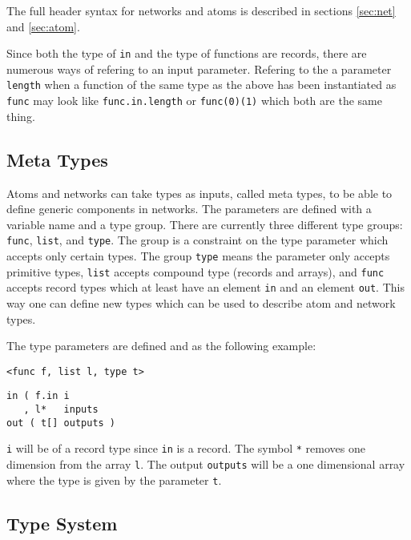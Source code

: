 The full header syntax for networks and atoms is described in sections
\autoref{sec:net} and \autoref{sec:atom}.

Since both the type of \verb#in# and the type of functions are
records, there are numerous ways of refering to an input
parameter. Refering to the a parameter \verb#length# when a function
of the same type as the above has been instantiated as \verb#func# may
look like \verb#func.in.length# or \verb#func(0)(1)# which both are
the same thing.

\subsection{Meta Types}\label{sec:meta}
Atoms and networks can take types as inputs, called meta types, to be
able to define generic components in networks. The parameters are
defined with a variable name and a type group. There are currently
three different type groups: \verb#func#, \verb#list#, and
\verb#type#. The group is a constraint on the type parameter which
accepts only certain types. The group \verb#type# means the parameter
only accepts primitive types, \verb#list# accepts compound type
(records and arrays), and \verb#func# accepts record types which at
least have an element \verb#in# and an element \verb#out#. This way
one can define new types which can be used to describe atom and
network types.

The type parameters are defined and as the following example:

\begin{verbatim}
<func f, list l, type t>
\end{verbatim}

\begin{verbatim}
in ( f.in i
   , l*   inputs
out ( t[] outputs )
\end{verbatim}

\verb#i# will be of a record type since \verb#in# is a record. The
symbol \verb#*# removes one dimension from the array \verb#l#. The
output \verb#outputs# will be a one dimensional array where the type
is given by the parameter \verb#t#.

\subsection{Type System}



